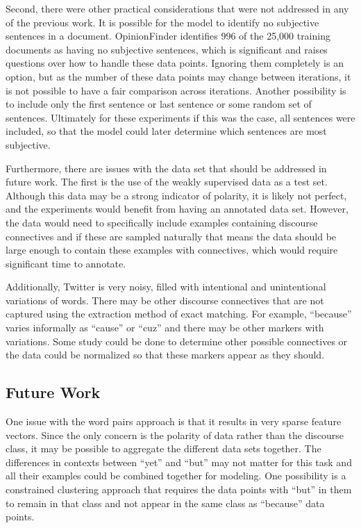 \documentclass[11pt,letterpaper]{article}
\begin{document}
Second, there were other practical considerations that were not addressed in any of the previous work.  It is possible for
the model to identify no subjective sentences in a document.  OpinionFinder identifies 996 of the 25,000 training documents as having
no subjective sentences, which is significant and raises questions over how to handle these data points.
Ignoring them completely is an option, but as the number of these data points may change between iterations, it is not
possible to have a fair comparison across iterations.  Another possibility is to include only the first sentence or last sentence
or some random set of sentences.  Ultimately for these experiments if this was the case, all sentences were included, so that
the model could later determine which sentences are most subjective.

Furthermore, there are issues with the data set that should be addressed in future work.  The first is the use of the weakly
supervised data as a test set.  Although this data may be a strong indicator of polarity, it is likely not perfect, and
the experiments would benefit from having an annotated data set.  However, the data would need to specifically include
examples containing discourse connectives 
and if these are sampled naturally that means the data should be large enough to contain these examples with
connectives, which would require significant time to annotate.

Additionally, Twitter is very noisy, filled with intentional and unintentional variations of words.  
There may be other discourse connectives that are not captured using the extraction method of exact matching.
For example, ``because'' varies informally as ``cause'' or ``cuz'' and there may be other markers with
variations.
Some study could be done to determine other possible connectives or the data could be normalized so that
these markers appear as they should.

\subsection{Future Work}
One issue with the word pairs approach is that it results in very sparse feature vectors.
Since the only concern is the polarity of data rather than the discourse class, 
it may be possible to aggregate the different data sets together.
The differences in contexts between ``yet'' and ``but'' may not matter for this task and all
their examples could be combined together for modeling.
One possibility is a constrained clustering approach that requires the data points with ``but'' in
them to remain in that class and not appear in the same class as ``because'' data points.
\end{document}
